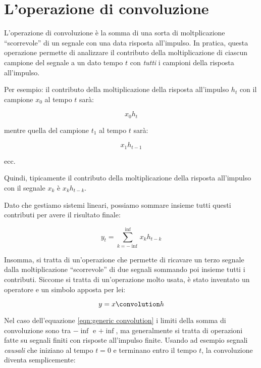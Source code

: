 %
%

\section{L'operazione di convoluzione\label{sec:convolution}}

L'operazione di convoluzione \`e la somma di una sorta di moltplicazione
``scorrevole'' di un segnale con una data risposta all'impulso.
In pratica, questa operazione permette di analizzare il contributo della
moltiplicazione di ciascun campione del segnale
a un dato tempo $t$
con \emph{tutti} i campioni della risposta all'impulso.

Per esempio: il contributo della moltiplicazione della
risposta all'impulso $h_t$ con il campione $x_0$ al tempo $t$ sar\`a:

\begin{equation}
  x_0 h_t
\end{equation}

mentre quella del campione $t_1$ al tempo $t$ sar\`a:

\begin{equation}
  x_1 h_{t-1}
\end{equation}

ecc.

Quindi, tipicamente il contributo della moltiplicazione della risposta
all'impulso con il segnale $x_k$ \`e $x_k h_{t-k}$.

Dato che gestiamo sistemi lineari, possiamo sommare insieme tutti questi
contributi per avere il risultato finale:

\begin{equation}\label{eqn:generic convolution}
  y_t = \sum_{k = -\inf}^{\inf}{x_k h_{t-k}}
\end{equation}

Insomma, si tratta di un'operazione che permette di ricavare un terzo segnale
dalla moltiplicazione ``scorrevole'' di due segnali sommando poi insieme tutti
i contributi. Siccome si tratta di un'operazione molto usata, \`e stato
inventato un operatore e un simbolo apposta per lei:

\begin{equation}
  y = x \convolution h
\end{equation}

Nel caso dell'equazione \vref{eqn:generic convolution} i limiti della somma di
convoluzione sono tra $-\inf$ e $+\inf$, ma generalmente si tratta di
operazioni fatte su segnali finiti con risposte all'impulso finite. Usando ad
esempio segnali \emph{causali} che iniziano al tempo $t = 0$ e terminano entro
il tempo $t$, la convoluzione diventa semplicemente:


